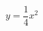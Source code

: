 \documentclass[preview]{standalone}
\begin{document}
\begin{align*}
y = \dfrac{1}{4}x^2
\end{align*}
\end{document}
